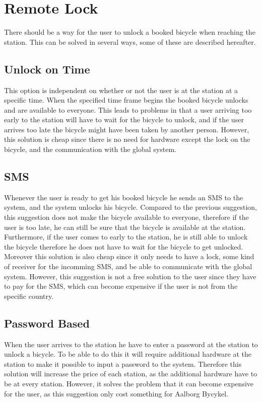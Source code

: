 \section{Remote Lock}\label{sec:remoteLock}
There should be a way for the user to unlock a booked bicycle when reaching the station.
This can be solved in several ways, some of these are described hereafter.

\subsection{Unlock on Time}
This option is independent on whether or not the user is at the station at a specific time.
When the specified time frame begins the booked bicycle unlocks and are available to everyone.
This leads to problems in that a user arriving too early to the station will have to wait for the bicycle to unlock, and if the user arrives too late the bicycle might have been taken by another person.
However, this solution is cheap since there is no need for hardware except the lock on the bicycle, and the communication with the global system.

\subsection{SMS}
Whenever the user is ready to get his booked bicycle he sends an SMS to the system, and the system unlocks his bicycle.
Compared to the previous suggestion, this suggestion does not make the bicycle available to everyone, therefore if the user is too late, he can still be sure that the bicycle is available at the station.
Furthermore, if the user comes to early to the station, he is still able to unlock the bicycle therefore he does not have to wait for the bicycle to get unlocked.
Moreover this solution is also cheap since it only needs to have a lock, some kind of receiver for the incomming SMS, and be able to communicate with the global system.
However, this suggestion is not a free solution to the user since they have to pay for the SMS, which can become expensive if the user is not from the specific country.

\subsection{Password Based}
When the user arrives to the station he have to enter a password at the station to unlock a bicycle.
To be able to do this it will require additional hardware at the station to make it possible to input a password to the system.
Therefore this solution will increase the price of each station, as the additional hardware have to be at every station.
However, it solves the problem that it can become expensive for the user, as this suggestion only cost something for Aalborg Bycykel.

